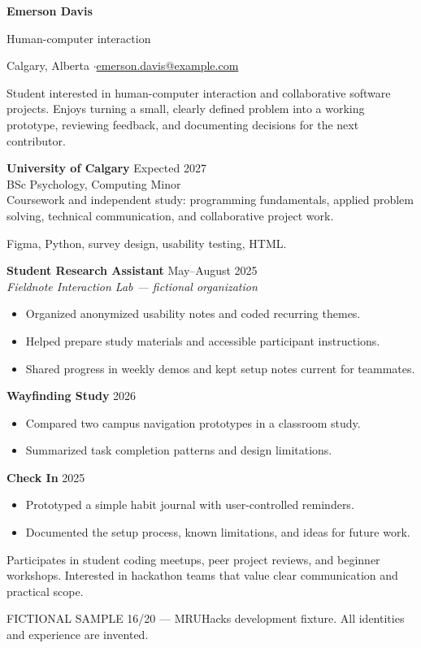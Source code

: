 
{\Huge\bfseries Emerson Davis}\par
{\large\color{accent} Human-computer interaction}\par
Calgary, Alberta \enspace$\cdot$\enspace \href{mailto:emerson.davis@example.com}{emerson.davis@example.com}

Student interested in human-computer interaction and collaborative software projects.
Enjoys turning a small, clearly defined problem into a working prototype,
reviewing feedback, and documenting decisions for the next contributor.

\textbf{University of Calgary} \hfill Expected 2027\\
BSc Psychology, Computing Minor\\
Coursework and independent study: programming fundamentals, applied problem solving,
technical communication, and collaborative project work.

Figma, Python, survey design, usability testing, HTML.

\textbf{Student Research Assistant} \hfill May--August 2025\\
\textit{Fieldnote Interaction Lab --- fictional organization}
\begin{itemize}
\item Organized anonymized usability notes and coded recurring themes.
\item Helped prepare study materials and accessible participant instructions.
\item Shared progress in weekly demos and kept setup notes current for teammates.
\end{itemize}

\textbf{Wayfinding Study} \hfill 2026
\begin{itemize}
\item Compared two campus navigation prototypes in a classroom study.
\item Summarized task completion patterns and design limitations.
\end{itemize}
\textbf{Check In} \hfill 2025
\begin{itemize}
\item Prototyped a simple habit journal with user-controlled reminders.
\item Documented the setup process, known limitations, and ideas for future work.
\end{itemize}

Participates in student coding meetups, peer project reviews, and beginner workshops.
Interested in hackathon teams that value clear communication and practical scope.

\vfill
{\footnotesize\color{gray} FICTIONAL SAMPLE 16/20 --- MRUHacks development fixture.
All identities and experience are invented.}

